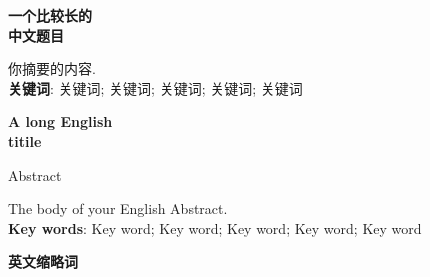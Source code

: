 \pagestyle{fancy}
\setcounter{page}{1}
\lhead{}
\rhead{}
\lfoot{}
\cfoot{\thepage}
\rfoot{}


\fontsize{12pt}{18pt}\selectfont \setcounter{page}{1}
\begin{center} 
	{\fontsize{15.75pt}{13pt}\selectfont\bf 一个比较长的\\中文题目}
\end{center}
\begin{center}
{\fontsize{15.75pt}{13pt}\selectfont{\bf 摘~要}} \vspace{1.0cm}
\end{center}
你摘要的内容.\\
\textbf{\hei 关键词}: 关键词;  关键词;  关键词;  关键词; 关键词

\newpage
\fontsize{12pt}{18pt}\selectfont 
\begin{center} {\fontsize{15.75pt}{13pt}\selectfont\bf
A long English \\ titile}\end{center}
\begin{center}
{\large Abstract} \vspace{1.0cm}
\end{center}
The body of your English Abstract.\\
\textbf{Key words}: Key word; Key word; Key word; Key word; Key word
\newpage


\begin{center} 
	{\fontsize{15.75pt}{13pt}\selectfont\bf 英文缩略词}
\end{center}


\newpage